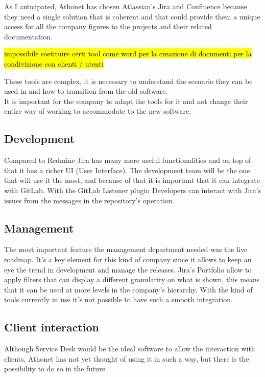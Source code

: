 	As I anticipated, Athonet has chosen Atlassian's Jira and Confluence because they need a single solution that is coherent and that could provide them a unique access for all the company figures to the projects and their related documentation.
	
	\hl{impossibile sostituire certi tool come word per la creazione di documenti per la condivizione con clienti / utenti}
	
	These tools are complex, it is necessary to understand the scenario they can be used in and how to transition from the old software.\\
	It is important for the company to adapt the tools for it and not change their entire way of working to accommodate to the new software.

	\subsection{Development} 
		Compared to Redmine Jira has many more useful functionalities and on top of that it has a richer UI (User Interface).
		The development team will be the one that will use it the most, and because of that it is important that it can integrate with GitLab.
		With the GitLab Listener plugin Developers can interact with Jira's issues from the messages in the repository's operation.
	
	\subsection{Management} 
		The most important feature the management department needed was the live roadmap.	
		It's a key element for this kind of company since it allows to keep an eye the trend in development and manage the releases.
		Jira's Portfolio allow to apply filters that can display a different granularity on what is shown, this means that it can be used at more levels in the company's hierarchy.
		With the kind of tools currently in use it's not possible to have such a smooth integration.
	
	\subsection{Client interaction} 
		Although Service Desk would be the ideal software to allow the interaction with clients, Athonet has not yet thought of using it in such a way, but there is the possibility to do so in the future.
		
